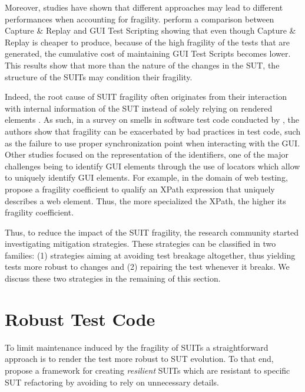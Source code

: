 Moreover, studies have shown that different approaches may lead to different performances when accounting for fragility. \textcite{Leotta2013, Leotta2014} perform a comparison between Capture \& Replay and GUI Test Scripting showing that even though Capture \& Replay is cheaper to produce, because of the high fragility of the tests that are generated, the cumulative cost of maintaining GUI Test Scripts becomes lower. This results show that more than the nature of the changes in the SUT, the structure of the SUITs may condition their fragility. 

Indeed, the root cause of SUIT fragility often originates from their interaction with internal information of the SUT instead of solely relying on rendered elements \textcite{Yandrapally2014}. As such, in a survey on smells in software test code conducted by \textcite{Garousi2018}, the authors show that fragility can be exacerbated by bad practices in test code, such as the failure to use proper synchronization point when interacting with the GUI. Other studies focused on the representation of the identifiers, one of the major challenges being to identify GUI elements through the use of locators \cite{Hammoudi2016} which allow to uniquely identify GUI elements. For example, in the domain of web testing, \textcite{Leotta2015} propose a fragility coefficient to qualify an XPath expression that uniquely describes a web element. Thus, the more specialized the XPath, the higher its fragility coefficient.

Thus, to reduce the impact of the SUIT fragility, the research community started investigating mitigation strategies. These strategies can be classified in two families: (1) strategies aiming at avoiding test breakage altogether, thus yielding tests more robust to changes and (2) repairing the test whenever it breaks. We discuss these two strategies in the remaining of this section.

\section{Robust Test Code}
\label{sec:related-robust}

To limit maintenance induced by the fragility of SUITs a straightforward approach is to render the test more robust to SUT evolution. To that end,\cite{Pirzadeh2014} propose a framework for creating \emph{resilient} SUITs which are resistant to specific SUT refactoring by avoiding to rely on unnecessary details. 

